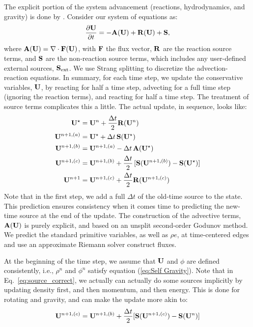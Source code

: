 The explicit portion of the system advancement (reactions,
hydrodynamics, and gravity) is done by .  Consider
our system of equations as:
\begin{equation}
\frac{\partial{\bf U}}{\partial t} = -{\bf A}({\bf U}) + {\bf R}({\bf U}) + {\bf S},
\end{equation}
where ${\bf A}({\bf U}) = \nabla \cdot {\bf F}({\bf U})$, with ${\bf F}$ the flux vector, ${\bf R}$ are the reaction
source terms, and ${\bf S}$ are the non-reaction source terms, which
includes any user-defined external sources, ${\bf S}_{\rm ext}$.  We use
Strang splitting to discretize the advection-reaction equations.  In
summary, for each time step, we update the conservative variables,
${\bf U}$, by reacting for half a time step, advecting for a full time
step (ignoring the reaction terms), and reacting for half a time step.
The treatment of source terms complicates this a little.  The actual
update, in sequence, looks like:
\begin{align}
{\bf U}^\star &= {\bf U}^n + \frac{\Delta t}{2}{\bf R}({\bf U}^n) \\
{\bf U}^{n+1,(a)} &= {\bf U}^\star + \Delta t\, {\bf S}({\bf U}^\star) \\
{\bf U}^{n+1,(b)} &= {\bf U}^{n+1,(a)} - \Delta t\, {\bf A}({\bf U}^\star) \\
{\bf U}^{n+1,(c)} &= {\bf U}^{n+1,(b)} + \frac{\Delta t}{2}\, [{\bf S}({\bf U}^{n+1,(b)}) - {\bf S}({\bf U}^\star)] \label{eq:source_correct}\\
{\bf U}^{n+1}     &= {\bf U}^{n+1,(c)} + \frac{\Delta t}{2} {\bf R}({\bf U}^{n+1,(c)})
\end{align}
Note that in the first step, we add a full $\Delta t$ of the old-time
source to the state.  This prediction ensures consistency when it
comes time to predicting the new-time source at the end of the update.
The construction of the advective terms, ${\bf A({\bf U})}$ is purely
explicit, and based on an unsplit second-order Godunov method.  We
predict the standard primitive variables, as well as $\rho e$, at
time-centered edges and use an approximate Riemann solver construct
fluxes.

At the beginning of the time step, we assume that ${\bf U}$ and $\phi$ are
defined consistently, i.e., $\rho^n$ and $\phi^n$ satisfy equation
(\ref{eq:Self Gravity}).  Note that in
Eq.~\ref{eq:source_correct}, we actually can actually do some 
sources implicitly by updating density first, and then momentum, 
and then energy.  This is done for rotating and gravity, and can
make the update more akin to:
\begin{equation}
{\bf U}^{n+1,(c)} = {\bf U}^{n+1,(b)} + \frac{\Delta t}{2} [{\bf S}({\bf U}^{n+1,(c)}) - {\bf S}({\bf U}^n)]
\end{equation}

